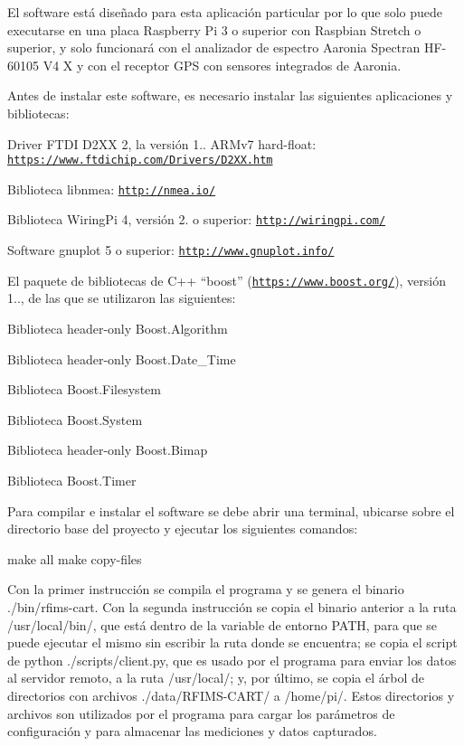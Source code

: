 El software está diseñado para esta aplicación particular por lo que solo puede executarse en una placa Raspberry Pi 3 o superior con Raspbian Stretch o superior, y solo funcionará con el analizador de espectro Aaronia Spectran H\+F-\/60105 V4 X y con el receptor G\+PS con sensores integrados de Aaronia.

Antes de instalar este software, es necesario instalar las siguientes aplicaciones y bibliotecas\+:


\begin{DoxyItemize}
\item Driver F\+T\+DI D2\+XX 2, la versión 1.. A\+R\+Mv7 hard-\/float\+: \href{https://www.ftdichip.com/Drivers/D2XX.htm}{\tt https\+://www.\+ftdichip.\+com/\+Drivers/\+D2\+X\+X.\+htm}
\item Biblioteca libnmea\+: \href{http://nmea.io/}{\tt http\+://nmea.\+io/}
\item Biblioteca Wiring\+Pi 4, versión 2. o superior\+: \href{http://wiringpi.com/}{\tt http\+://wiringpi.\+com/}
\item Software gnuplot 5 o superior\+: \href{http://www.gnuplot.info/}{\tt http\+://www.\+gnuplot.\+info/}
\item El paquete de bibliotecas de C++ “boost” (\href{https://www.boost.org/}{\tt https\+://www.\+boost.\+org/}), versión 1.., de las que se utilizaron las siguientes\+:
\begin{DoxyItemize}
\item Biblioteca header-\/only Boost.\+Algorithm
\item Biblioteca header-\/only Boost.\+Date\+\_\+\+Time
\item Biblioteca Boost.\+Filesystem
\item Biblioteca Boost.\+System
\item Biblioteca header-\/only Boost.\+Bimap
\item Biblioteca Boost.\+Timer
\end{DoxyItemize}
\end{DoxyItemize}

Para compilar e instalar el software se debe abrir una terminal, ubicarse sobre el directorio base del proyecto y ejecutar los siguientes comandos\+: \begin{DoxyVerb}make all
make copy-files
\end{DoxyVerb}


Con la primer instrucción se compila el programa y se genera el binario ./bin/rfims-\/cart. Con la segunda instrucción se copia el binario anterior a la ruta /usr/local/bin/, que está dentro de la variable de entorno P\+A\+TH, para que se puede ejecutar el mismo sin escribir la ruta donde se encuentra; se copia el script de python ./scripts/client.py, que es usado por el programa para enviar los datos al servidor remoto, a la ruta /usr/local/; y, por último, se copia el árbol de directorios con archivos ./data/\+R\+F\+I\+M\+S-\/\+C\+A\+R\+T/ a /home/pi/. Estos directorios y archivos son utilizados por el programa para cargar los parámetros de configuración y para almacenar las mediciones y datos capturados.

